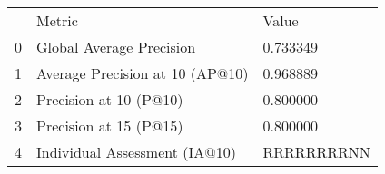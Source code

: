 \begin{tabular}{lll}
 & Metric & Value \\
0 & Global Average Precision & 0.733349 \\
1 & Average Precision at 10 (AP@10) & 0.968889 \\
2 & Precision at 10 (P@10) & 0.800000 \\
3 & Precision at 15 (P@15) & 0.800000 \\
4 & Individual Assessment (IA@10) & RRRRRRRRNN \\
\end{tabular}

